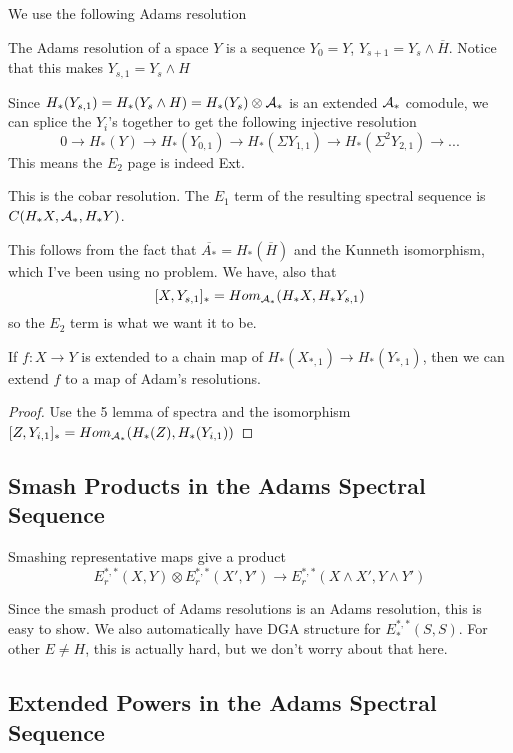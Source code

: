 We use the following Adams resolution
\begin{Def}
  The Adams resolution of a space $Y$ is a sequence $Y_0=Y$, $Y_{s+1}=Y_s\wedge\overline{H}$.  
  Notice that this makes $Y_{s,1}=Y_s\wedge H$
\end{Def}


Since $H_*(Y_{s,1})=H_*(Y_s\wedge H)=H_*(Y_s)\otimes \mathcal{A}_*$ is an extended $\mathcal{A}_*$ comodule, we can splice the $Y_i$'s together to get the following injective resolution
\[0\to H_*(Y)\to H_*(Y_{0,1})\to H_*(\Sigma Y_{1,1})\to H_*(\Sigma^2 Y_{2,1})\to ...\]
This means the $E_2$ page is indeed Ext.


\begin{Lemma}
  This is the cobar resolution.  The $E_1$ term of the resulting spectral sequence is $C(H_*X, \mathcal{A}_*,H_*Y)$.  
\end{Lemma}

This follows from the fact that $\overline{A_*}=H_*(\overline{H})$ and the Kunneth isomorphism, which I've been using no problem.  
We have, also that 
\[[X,Y_{s,1}]_*=Hom_{\mathcal{A}_*}(H_*X,H_*Y_{s,1})\]
so the $E_2$ term is what we want it to be.  


\begin{Lemma}
  If $f:X\to Y$ is extended to a chain map of $H_*(X_{*,1})\to H_*(Y_{*,1})$, then we can extend $f$ to a map of Adam's resolutions.
\end{Lemma}

\begin{proof}
  Use the 5 lemma of spectra and the isomorphism $[Z,Y_{i,1}]_*=Hom_{\mathcal{A}_*}(H_*(Z),H_*(Y_{i,1}))$
\end{proof}

\subsection{Smash Products in the Adams Spectral Sequence}

\begin{Theorem}
Smashing representative maps give a product
\[E_r^{*,*}(X,Y)\otimes E_r^{*,*}(X',Y') \to E_r^{*,*}(X\wedge X',Y\wedge Y')\]
\end{Theorem}
Since the smash product of Adams resolutions is an Adams resolution, this is easy to show.
We also automatically have DGA structure for $E_*^{*,*}(S,S)$.  
For other $E\ne H$, this is actually hard, but we don't worry about that here.

\subsection{Extended Powers in the Adams Spectral Sequence}

